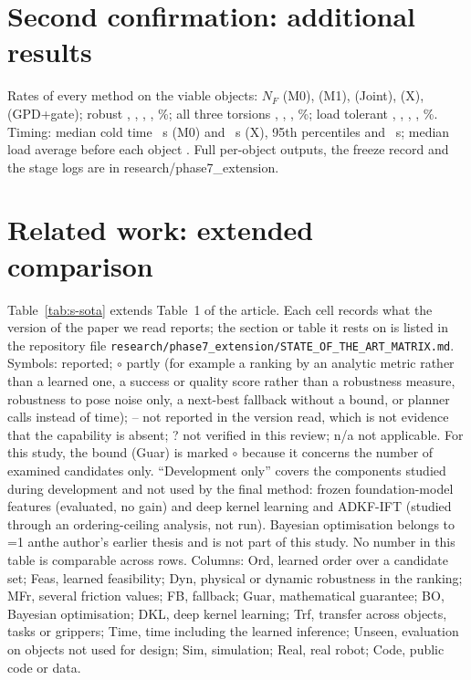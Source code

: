 \documentclass[pdflatex,sn-mathphys-num]{sn-jnl}
\providecommand{\anonymous}{0}
\newcommand{\anon}[2]{\ifnum\anonymous=1 #1\else #2\fi}
\begin{document}
\section{Second confirmation: additional results}

Rates of every method on the \nxViable{} viable objects: $N_F$ \nxNFMzero{} (M0), \nxNFMone{} (M1), \nxNFJhist{} (Joint), \nxNFX{} (X), \nxNFGPD{} (GPD+gate); robust \nxRobMzero, \nxRobMone, \nxRobJhist, \nxRobX, \nxRobGPD\%; all three torsions \nxAllMzero, \nxAllMone, \nxAllJhist, \nxAllX\%; load tolerant \nxLoadMzero, \nxLoadMone, \nxLoadJhist, \nxLoadX, \nxLoadGPD\%. Timing: median cold time \nxTimeMzero~s (M0) and \nxTimeX~s (X), 95th percentiles \nxTimeMzeroPninetyfive{} and \nxTimeXPninetyfive~s; median load average before each object \nxLoadBefore. Full per-object outputs, the freeze record and the stage logs are in research/phase7\_extension.

\section{Related work: extended comparison}

Table~\ref{tab:s-sota} extends Table~1 of the article. Each cell records what the version of the paper we read reports; the section or table it rests on is listed in the repository file \texttt{research/phase7\_extension/STATE\_OF\_THE\_ART\_MATRIX.md}. Symbols: \checkmark{} reported; $\circ$ partly (for example a ranking by an analytic metric rather than a learned one, a success or quality score rather than a robustness measure, robustness to pose noise only, a next-best fallback without a bound, or planner calls instead of time); -- not reported in the version read, which is not evidence that the capability is absent; ? not verified in this review; n/a not applicable. For this study, the bound (Guar) is marked $\circ$ because it concerns the number of examined candidates only. ``Development only'' covers the components studied during development and not used by the final method: frozen foundation-model features (evaluated, no gain) and deep kernel learning and ADKF-IFT (studied through an ordering-ceiling analysis, not run). Bayesian optimisation belongs to \anon{an}{the author's} earlier thesis and is not part of this study. No number in this table is comparable across rows. Columns: Ord, learned order over a candidate set; Feas, learned feasibility; Dyn, physical or dynamic robustness in the ranking; MFr, several friction values; FB, fallback; Guar, mathematical guarantee; BO, Bayesian optimisation; DKL, deep kernel learning; Trf, transfer across objects, tasks or grippers; Time, time including the learned inference; Unseen, evaluation on objects not used for design; Sim, simulation; Real, real robot; Code, public code or data.
\end{document}
